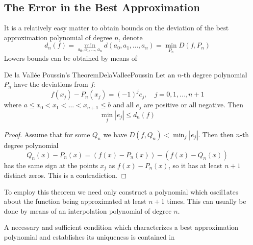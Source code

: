 \documentclass[../main.tex]{subfiles}
\begin{document}
\subsection{The Error in the Best Approximation}
It is a relatively easy matter to obtain bounds on the deviation of the best approximation polynomial of degree $n$, denote
\begin{equation*}
	d_n(f) = \min_{a_0, a_1, \dots, a_n} d(a_0, a_1, \dots, a_n) = \min_{P_n} D(f, P_n)
\end{equation*}
Lowers bounds can be obtained by means of

\begin{theorem}{De la Vallée Poussin's Theorem}{DelaValleePoussin}
	Let an $n$-th degree polynomial $P_n$ have the deviations from $f$:
	\begin{equation}
		f(x_j) - P_n(x_j) = (-1)^j e_j, \quad j = 0, 1, \dots, n+1
	\end{equation}
	where $a \leq x_0 < x_1 < \dots < x_{n+1} \leq b$ and all $e_j$ are positive or all negative. Then
	\begin{equation}
		\min_j |e_j| \leq d_n(f)
	\end{equation}
\end{theorem}
\begin{proof}
	Assume that for some $Q_n$ we have $D(f, Q_n) < \min_j |e_j|$. Then then $n$-th degree polynomial
	\begin{equation}
		Q_n(x) - P_n(x) = (f(x) - P_n(x)) - (f(x) - Q_n(x))
	\end{equation}
	has the same sign at the points $x_j$ as $f(x) - P_n(x)$, so it has at least $n+1$ distinct zeros. This is a contradiction.
\end{proof}

To employ this theorem we need only construct a polynomial which oscil1ates about the function being approximated at least $n+1$ times. This can usually be done by means of an interpolation polynomial of degree $n$.

A necessary and sufficient condition which characterizes a best approximation polynomial and establishes its uniqueness is contained in
\end{document}
